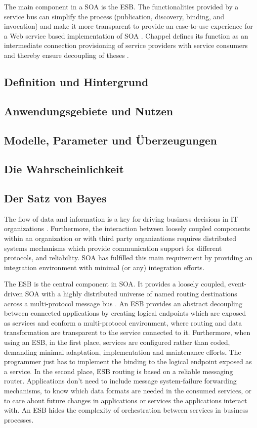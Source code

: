 The main component in a \ac{SOA} is the \ac{ESB}. The functionalities provided by a service bus can simplify the process (publication, discovery, binding, and invocation) and make it more transparent to provide an ease-to-use experience for a Web service based implementation of \ac{SOA} \cite{Weera2005}. Chappel defines its function as an intermediate connection provisioning of service providers with service consumers and thereby ensure decoupling of theses \cite{Chapp2004}. 

\subsection{Definition und Hintergrund}
\subsection{Anwendungsgebiete und Nutzen}
\subsection{Modelle, Parameter und Überzeugungen}
\subsection{Die Wahrscheinlichkeit}
\subsection{Der Satz von Bayes}
The flow of data and information is a key for driving business decisions in IT organizations \cite{Chapp2004}. Furthermore, the interaction between loosely coupled components within an organization or with third party organizations requires distributed systems mechanisms which provide communication support for different protocols, and reliability. SOA has fulfilled this main requirement by providing an integration environment with minimal (or any) integration efforts. 

The \ac{ESB} is the central component in \ac{SOA}. It provides a loosely coupled, event-driven \ac{SOA} with a highly distributed universe of named routing destinations across a multi-protocol message bus \cite{Chapp2004}. An \ac{ESB} provides an abstract decoupling between connected applications by creating logical endpoints which are exposed as services and conform a multi-protocol environment, where routing and data transformation are transparent to the service connected to it. Furthermore, when using an \ac{ESB}, in the first place, services are configured rather than coded, demanding minimal adaptation, implementation and maintenance efforts. The programmer just has to implement the binding to the logical endpoint exposed as a service. In the second place, \ac{ESB} routing is based on a reliable messaging router. Applications don't need to include message system-failure forwarding mechanisms, to know which data formats are needed in the consumed services, or to care about future changes in applications or services the applications interact with. An \ac{ESB} hides the complexity of orchestration between services in business processes. 

